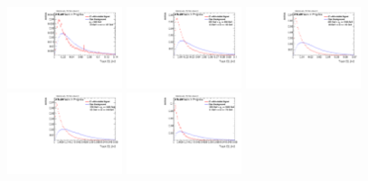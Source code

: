 \begin{figure}
\includegraphics[width=0.3\textwidth]{sascha_input/Appendix/Distributions/higgs/distributions/beta2/h_normal_tj_C2_2_bin1.pdf} \hspace{1mm}
\includegraphics[width=0.3\textwidth]{sascha_input/Appendix/Distributions/higgs/distributions/beta2/h_normal_tj_C2_2_bin2.pdf} \hspace{4mm}
\includegraphics[width=0.3\textwidth]{sascha_input/Appendix/Distributions/higgs/distributions/beta2/h_normal_tj_C2_2_bin3.pdf} 
\bigskip
\includegraphics[width=0.3\textwidth]{sascha_input/Appendix/Distributions/higgs/distributions/beta2/h_normal_tj_C2_2_bin4.pdf} \hspace{4mm}
\includegraphics[width=0.3\textwidth]{sascha_input/Appendix/Distributions/higgs/distributions/beta2/h_normal_tj_C2_2_bin5.pdf} 


\end{figure}

